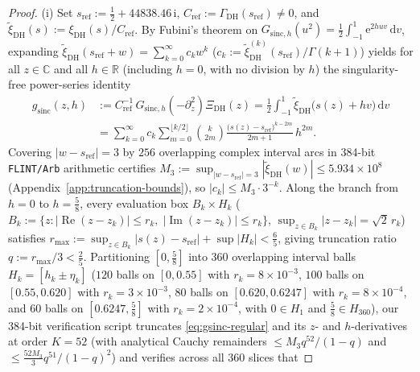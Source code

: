 \documentclass[11pt,a4paper,reqno]{amsart}
\theoremstyle{definition}
\theoremstyle{remark}
\numberwithin{equation}{section}
\newcommand{\R}{\mathbb{R}}
\newcommand{\C}{\mathbb{C}}
\newcommand{\dd}{\mathrm{d}}
\newcommand{\ii}{\mathrm{i}}
\newcommand{\ee}{\mathrm{e}}
\DeclareMathOperator{\Reop}{Re}
\DeclareMathOperator{\Imop}{Im}
\begin{document}
\begin{proof}
(i) Set $s_{\mathrm{ref}} := \frac{1}{2} + 44838.46\,\ii$, $C_{\mathrm{ref}} := \Gamma_{\mathrm{DH}}(s_{\mathrm{ref}}) \ne 0$, and $\tilde{\xi}_{\mathrm{DH}}(s) := \xi_{\mathrm{DH}}(s)/C_{\mathrm{ref}}$. By Fubini's theorem on $G_{\mathrm{sinc},h}(u^2) = \frac{1}{2}\int_{-1}^{1}\ee^{2huv}\,\dd v$, expanding $\tilde{\xi}_{\mathrm{DH}}(s_{\mathrm{ref}} + w) = \sum_{k=0}^{\infty} c_k w^k$ ($c_k := \tilde{\xi}_{\mathrm{DH}}^{(k)}(s_{\mathrm{ref}})/\Gamma(k+1)$) yields for all $z \in \C$ and all $h \in \R$ (including $h = 0$, with no division by $h$) the singularity-free power-series identity
\begin{equation}
  \begin{aligned}
    g_{\mathrm{sinc}}(z, h)
    &:= C_{\mathrm{ref}}^{-1}\,G_{\mathrm{sinc},h}(-\partial_z^2)\Xi_{\mathrm{DH}}(z)
    = \frac{1}{2}\int_{-1}^{1} \tilde{\xi}_{\mathrm{DH}}\bigl(s(z) + hv\bigr)\,\dd v \\
    &= \sum_{k=0}^{\infty} c_k \sum_{m=0}^{\lfloor k/2\rfloor}\binom{k}{2m}\frac{\bigl(s(z) - s_{\mathrm{ref}}\bigr)^{k-2m}}{2m + 1}\,h^{2m}.
  \end{aligned}
  \label{eq:gsinc-regular}
\end{equation}
Covering $|w - s_{\mathrm{ref}}| = 3$ by $256$ overlapping complex interval arcs in 384-bit \texttt{FLINT/Arb} arithmetic certifies $M_3 := \sup_{|w - s_{\mathrm{ref}}| = 3}|\tilde{\xi}_{\mathrm{DH}}(w)| \le 5.934 \times 10^8$ (Appendix~\ref{app:truncation-bounds}), so $|c_k| \le M_3\cdot 3^{-k}$. Along the branch from $h = 0$ to $h = \frac{5}{8}$, every evaluation box $B_k \times H_k$ ($B_k := \{z : |\Reop(z - z_k)| \le r_k,\; |\Imop(z - z_k)| \le r_k\}$, $\sup_{z \in B_k}|z - z_k| = \sqrt{2}\,r_k$) satisfies $r_{\max} := \sup_{z \in B_k}|s(z) - s_{\mathrm{ref}}| + \sup|H_k| < \frac{6}{5}$, giving truncation ratio $q := r_{\max}/3 < \frac{2}{5}$. Partitioning $[0, \frac{5}{8}]$ into $360$ overlapping interval balls $H_k = [h_k \pm \eta_k]$ ($120$ balls on $[0, 0.55]$ with $r_k = 8 \times 10^{-3}$, $100$ balls on $[0.55, 0.620]$ with $r_k = 3 \times 10^{-3}$, $80$ balls on $[0.620, 0.6247]$ with $r_k = 8 \times 10^{-4}$, and $60$ balls on $[0.6247, \frac{5}{8}]$ with $r_k = 2 \times 10^{-4}$, with $0 \in H_1$ and $\frac{5}{8} \in H_{360}$), our 384-bit verification script truncates \eqref{eq:gsinc-regular} and its $z$- and $h$-derivatives at order $K = 52$ (with analytical Cauchy remainders $\le M_3 q^{52}/(1 - q)$ and $\le \frac{52 M_3}{3}q^{51}/(1 - q)^2$) and verifies across all $360$ slices that

\end{proof}
\end{document}
